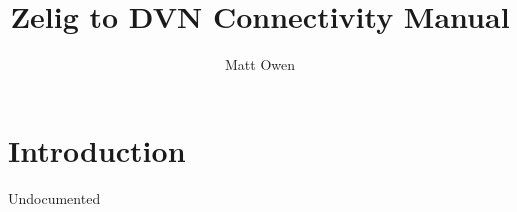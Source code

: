 \documentclass{article}
\title{Zelig to DVN Connectivity Manual}
\author{Matt Owen}
\begin{document}
\maketitle

\section{Introduction}

Undocumented
\end{document}
